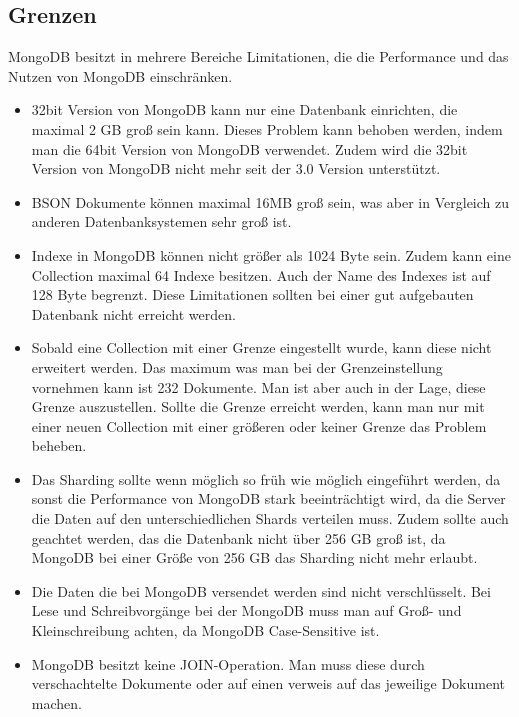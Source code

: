 \subsection{Grenzen}
MongoDB besitzt in mehrere Bereiche Limitationen, die die Performance und das Nutzen von MongoDB einschränken. 
\begin{itemize}
\item 32bit Version von MongoDB kann nur eine Datenbank einrichten, die maximal 2 GB groß sein kann. Dieses Problem kann behoben werden, indem man die 64bit Version von MongoDB verwendet. Zudem wird die 32bit Version von MongoDB nicht mehr seit der 3.0 Version unterstützt.
\item BSON Dokumente können maximal 16MB groß sein, was aber in Vergleich zu anderen Datenbanksystemen sehr groß ist.
\item Indexe in MongoDB können nicht größer als 1024 Byte sein. Zudem kann eine Collection maximal 64 Indexe besitzen. Auch der Name des Indexes ist auf 128 Byte begrenzt. Diese Limitationen sollten bei einer gut aufgebauten Datenbank nicht erreicht werden.
\item Sobald eine Collection mit einer Grenze eingestellt wurde, kann diese nicht erweitert werden. Das maximum was man bei der Grenzeinstellung vornehmen kann ist 232 Dokumente. Man ist aber auch in der Lage, diese Grenze auszustellen. Sollte die Grenze erreicht werden, kann man nur mit einer neuen Collection mit einer größeren oder keiner Grenze das Problem beheben.
\item Das Sharding sollte wenn möglich so früh wie möglich eingeführt werden, da sonst die Performance von MongoDB stark beeinträchtigt wird, da die Server die Daten auf den unterschiedlichen Shards verteilen muss. Zudem sollte auch geachtet werden, das die Datenbank nicht über 256 GB groß ist, da MongoDB bei einer Größe von 256 GB das Sharding nicht mehr erlaubt.
\item Die Daten die bei MongoDB versendet werden sind nicht verschlüsselt.
Bei Lese und Schreibvorgänge bei der MongoDB muss man auf Groß- und Kleinschreibung achten, da MongoDB Case-Sensitive ist.
\item MongoDB besitzt keine JOIN-Operation. Man muss diese durch verschachtelte Dokumente oder auf einen verweis auf das jeweilige Dokument machen.
\end{itemize}